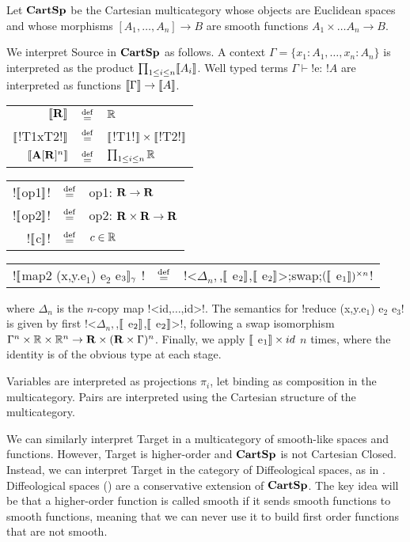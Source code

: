 \begin{definition}[$\CartSp$]
Let $\CartSp$ be the Cartesian multicategory whose objects are Euclidean spaces
and whose morphisms $[A_1,\ldots,A_n]\to B$ are smooth functions $A_1\times\ldots A_n \to B$.

We interpret Source in $\CartSp$ as follows. A context $\Gamma=\{x_1:A_1,\ldots,x_n:A_n\}$ is interpreted as the product $\prod_{1\leq i \leq n}\llbracket A_i\rrbracket$.
Well typed terms $\Gamma\vdash$!e: !$A$ are interpreted as functions $\llbracket \Gamma\rrbracket\to\llbracket A\rrbracket$.

    \begin{tabular}{r c l}
    $\llbracket \mathbf{R} \rrbracket$ & $\stackrel {\mathrm{def}}=$& $\mathbb{R}$ \\
    $\llbracket$!T1xT2!$\rrbracket$ & $\stackrel {\mathrm{def}}=$& $\llbracket$!T1!$\rrbracket \times\llbracket$!T2!$\rrbracket$ \\
    $\llbracket \mathbf{A}[\mathbf{R}]^{n}\rrbracket$ & $\stackrel {\mathrm{def}}=$ & $\prod_{1\leq i \leq n} \mathbb{R}$ \\
    \end{tabular}
    \begin{tabular}{r c l} 
        !$\llbracket$op1$\rrbracket$! & $\stackrel {\mathrm{def}}=$ & op1: $\mathbf{R}\to\mathbf{R}$ \\
        !$\llbracket$op2$\rrbracket$! & $\stackrel {\mathrm{def}}=$ & op2: $\mathbf{R}\times \mathbf{R}\to\mathbf{R}$ \\
        !$\llbracket$c$\rrbracket$! & $\stackrel {\mathrm{def}}=$ & $c\in\mathbb{R}$ \\
    \end{tabular}

    \begin{tabular}{r c l} 
    !$\llbracket$map2 (x,y.e$_1$) e$_2$ e$_3\rrbracket_\gamma$ ! & $\stackrel {\mathrm{def}}=$ & !<$\Delta_n,$,$\llbracket$ e$_2\rrbracket$,$\llbracket$ e$_2\rrbracket$>;swap;$(\llbracket$ e$_1\rrbracket)^{\times n}$!
    \end{tabular}
    
where $\Delta_n$ is the $n$-copy map !<id,$\ldots$,id>!.
The semantics for !reduce (x,y.e$_1$) e$_2$ e$_3$! is given by first !<$\Delta_n,$,$\llbracket$ e$_2\rrbracket$,$\llbracket$ e$_2\rrbracket$>!, following a swap isomorphism  $\Gamma^n \times \mathbb{R} \times \mathbb{R}^n \to \mathbf{R} \times (\mathbf{R} \times \Gamma)^n$. 
Finally, we apply $\llbracket$ e$_1\rrbracket \times id$ $n$ times, where the identity is of the obvious type at each stage.

Variables are interpreted as projections $\pi_i$, let binding as composition in the multicategory. 
Pairs are interpreted using the Cartesian structure of the multicategory.
\end{definition}

We can similarly interpret Target in a multicategory of smooth-like spaces and functions. 
However, Target is higher-order and $\CartSp$ is not Cartesian Closed. 
Instead, we can interpret Target in the category of Diffeological spaces, 
as in \cite{huot2020correctness}. 
Diffeological spaces (\cite{iglesias2013diffeology}) are a conservative extension of $\CartSp$. 
The key idea will be that a higher-order function is called smooth if it sends smooth functions to smooth functions, meaning that we can never use it
to build first order functions that are not smooth.

